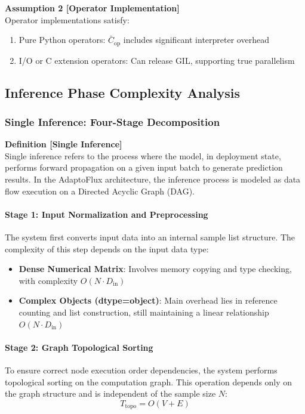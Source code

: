 \textbf{Assumption 2 [Operator Implementation]} \\
Operator implementations satisfy:
\begin{enumerate}
    \item Pure Python operators: $\bar{C}_{\mathrm{op}}$ includes significant interpreter overhead
    \item I/O or C extension operators: Can release GIL, supporting true parallelism
\end{enumerate}

\subsection{Inference Phase Complexity Analysis}

\subsubsection{Single Inference: Four-Stage Decomposition}
\label{sec:single_inference}

\textbf{Definition [Single Inference]} \\
Single inference refers to the process where the model, in deployment state, performs forward propagation on a given input batch to generate prediction results. In the AdaptoFlux architecture, the inference process is modeled as data flow execution on a Directed Acyclic Graph (DAG).

\paragraph{Stage 1: Input Normalization and Preprocessing}
The system first converts input data into an internal sample list structure. The complexity of this step depends on the input data type:
\begin{itemize}
    \item \textbf{Dense Numerical Matrix}: Involves memory copying and type checking, with complexity $O(N \cdot D_{\mathrm{in}})$
    \item \textbf{Complex Objects (dtype=object)}: Main overhead lies in reference counting and list construction, still maintaining a linear relationship $O(N \cdot D_{\mathrm{in}})$
\end{itemize}

\paragraph{Stage 2: Graph Topological Sorting}
To ensure correct node execution order dependencies, the system performs topological sorting on the computation graph. This operation depends only on the graph structure and is independent of the sample size $N$:
\begin{equation}
    T_{\mathrm{topo}} = O(V + E)
\end{equation}

